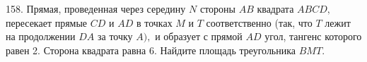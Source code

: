 158. Прямая, проведенная через середину $N$ стороны $AB$ квадрата $ABCD,$ пересекает прямые $CD$ и
$AD$ в точках $M$ и $T$ соответственно (так, что $T$ лежит на продолжении $DA$ за точку $A),$ и
образует с прямой $AD$ угол, тангенс которого равен 2. Сторона квадрата равна 6. Найдите площадь треугольника $BMT.$\\
